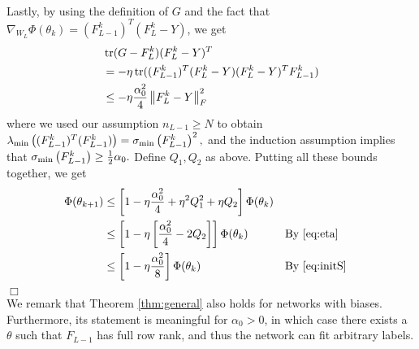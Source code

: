 \documentclass{article}
\newenvironment{proof}{\par\noindent{\bf Proof:\ }}{\hfill$\Box$\\[2mm]}
\newcommand{\norm}[1]{\left\|#1\right\|}
\newcommand{\svmin}[1]{\sigma_{\rm min}\left(#1\right)}
\newcommand{\evmin}[1]{\lambda_{\rm min}\left(#1\right)}
\def\tr{\mathop{\rm tr}\nolimits}
\begin{document}
\begin{proof}
\begin{align*}
    \end{align*}
    Lastly, by using the definition of $G$ and the fact that 
    $\nabla_{W_L}\Phi(\theta_k)=(F_{L-1}^k)^T (F_L^k-Y)$, we get
    \begin{align*}
	&\tr(G-F_L^k)(F_L^k-Y)^T\\
	&= -\eta \tr((F_{L-1}^k)^T (F_L^k-Y)(F_L^k-Y)^T F_{L-1}^k)\\
	&\leq -\eta \frac{\alpha_0^2}{4} \norm{F_L^k-Y}_F^2 
    \end{align*}
    where we used our assumption $n_{L-1}\geq N$ to obtain $\evmin{(F_{L-1}^k)^T(F_{L-1}^k)}=\svmin{F_{L-1}^k}^2,$
    and the induction assumption implies that $\svmin{F_{L-1}^k}\geq \frac{1}{2}\alpha_0.$
    Define $Q_1,Q_2$ as above. Putting all these bounds together, we get
    \begin{align*}
	\Phi(\theta_{k+1}) 
	&\leq 
	\left[ 1-\eta\frac{\alpha_0^2}{4}
	+ \eta^2 Q_1^2 
	+ \eta Q_2 
	\right]
	\Phi(\theta_k) \\
	&\leq \left[ 1-\eta \left[\frac{\alpha_0^2}{4} - 2Q_2 \right] \right] \Phi(\theta_k) && \textrm{By \eqref{eq:eta}} \\ 
	&\leq \left[ 1-\eta \frac{\alpha_0^2}{8} \right] \Phi(\theta_k) && \textrm{By }\eqref{eq:initS}
    \end{align*}
\end{proof}
We remark that Theorem \ref{thm:general} also holds for networks with biases.
Furthermore, its statement is meaningful for $\alpha_0>0$,
in which case there exists a $\theta$ such that $F_{L-1}$ has full row rank,
and thus the network can fit arbitrary labels.
\end{document}
